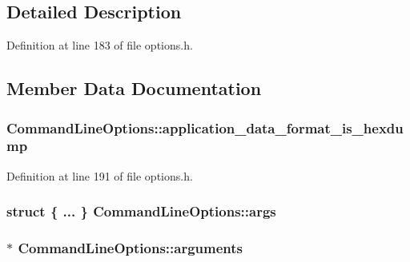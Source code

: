\subsection{Detailed Description}


Definition at line 183 of file options.\+h.



\subsection{Member Data Documentation}
\subsubsection[{\texorpdfstring{application\+\_\+data\+\_\+format\+\_\+is\+\_\+hexdump}{application_data_format_is_hexdump}}]{ Command\+Line\+Options\+::application\+\_\+data\+\_\+format\+\_\+is\+\_\+hexdump}\hypertarget{struct_command_line_options_a39a4636db242a0d1ef18f29dba7e634a}{}\label{struct_command_line_options_a39a4636db242a0d1ef18f29dba7e634a}


Definition at line 191 of file options.\+h.

\subsubsection[{\texorpdfstring{args}{args}}]{\setlength{\rightskip}{0pt plus 5cm}struct \{ ... \}   Command\+Line\+Options\+::args}\hypertarget{struct_command_line_options_a794a001bfd238ab78ef40ec78de0f0be}{}\label{struct_command_line_options_a794a001bfd238ab78ef40ec78de0f0be}
\subsubsection[{\texorpdfstring{arguments}{arguments}}]{$\ast$ Command\+Line\+Options\+::arguments}\hypertarget{struct_command_line_options_a48e1ce91f3a4589e96861fabb18e24c9}{}\label{struct_command_line_options_a48e1ce91f3a4589e96861fabb18e24c9}


